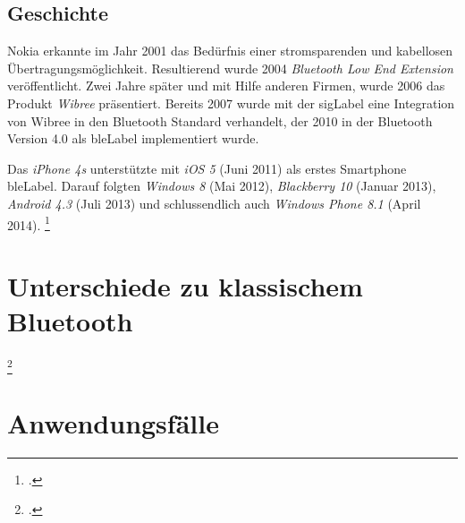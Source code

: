 \subsection{Geschichte}
Nokia erkannte im Jahr 2001 das Bedürfnis einer stromsparenden und kabellosen Übertragungsmöglichkeit. Resultierend wurde 2004 \textit{Bluetooth Low End Extension} veröffentlicht.
Zwei Jahre später und mit Hilfe anderen Firmen, wurde 2006 das Produkt \textit{Wibree} präsentiert.
Bereits 2007 wurde mit der \gls{sigLabel} eine Integration von Wibree in den Bluetooth Standard verhandelt, der 2010 in der Bluetooth Version 4.0 als \gls{bleLabel} implementiert wurde.

Das \textit{iPhone 4s} unterstützte mit \textit{iOS 5} (Juni 2011) als erstes Smartphone \gls{bleLabel}.
Darauf folgten \textit{Windows 8} (Mai 2012), \textit{Blackberry 10} (Januar 2013), \textit{Android 4.3} (Juli 2013) und schlussendlich auch \textit{Windows Phone 8.1} (April 2014).
\footcite{Bluetooth_low_energy_Wikipedia_2015-04-17}



\section{Unterschiede zu klassischem Bluetooth}
\footcite{powerconsumption_comparison_2015-04-27}

\section{Anwendungsfälle}


